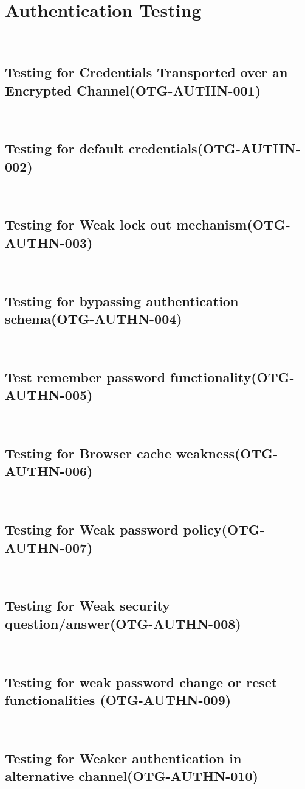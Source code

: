 \documentclass[headsepline,footsepline,footinclude=false,oneside,fontsize=11pt,paper=a4,listof=totoc,bibliography=totoc]{scrbook} %
\begin{document}
\pagebreak 
\section{Authentication Testing}\
\subsection{Testing for Credentials Transported over an Encrypted Channel(OTG-AUTHN-001)}\
\pagebreak 
\subsection{Testing for default credentials(OTG-AUTHN-002)}\
\pagebreak 
\subsection{Testing for Weak lock out mechanism(OTG-AUTHN-003)}\
\pagebreak 
\subsection{Testing for bypassing authentication schema(OTG-AUTHN-004)}\
\pagebreak 
\subsection{Test remember password functionality(OTG-AUTHN-005)}\
\pagebreak 
\subsection{Testing for Browser cache weakness(OTG-AUTHN-006)}\
\pagebreak 
\subsection{Testing for Weak password policy(OTG-AUTHN-007)}\
\pagebreak 
\subsection{Testing for Weak security question/answer(OTG-AUTHN-008)}\
\pagebreak 
\subsection{Testing for weak password change or reset functionalities (OTG-AUTHN-009)}\
\pagebreak 
\subsection{Testing for Weaker authentication in alternative channel(OTG-AUTHN-010)}\
 
\end{document}
